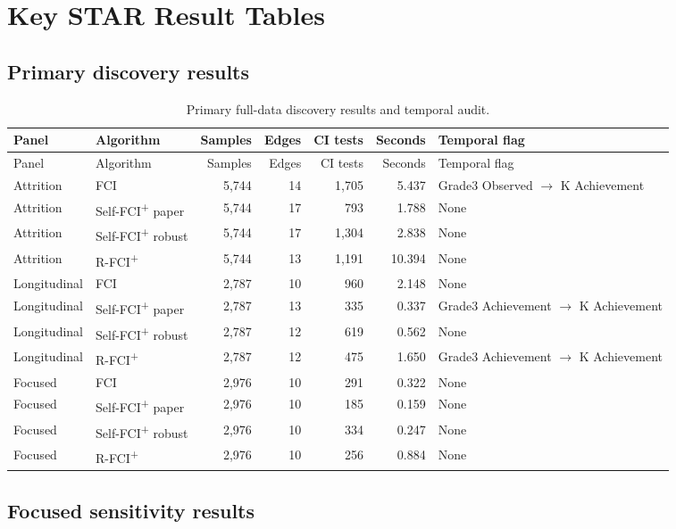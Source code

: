 \documentclass[11pt,a4paper,oneside]{report}
\newcommand{\FCIplus}{FCI\textsuperscript{+}}
\begin{document}
\chapter{Key STAR Result Tables}

\section{Primary discovery results}

\small
\begin{longtable}{@{}p{}p{}rrrrp{}@{}}
\caption{Primary full-data discovery results and temporal audit.}
\label{tab:all-runs}\\
\toprule
Panel & Algorithm & Samples & Edges & CI tests & Seconds & Temporal flag \\
\midrule
\endfirsthead
\toprule
Panel & Algorithm & Samples & Edges & CI tests & Seconds & Temporal flag \\
\midrule
\endhead
Attrition & FCI & 5,744 & 14 & 1,705 & 5.437 &
Grade3 Observed \(\to\) K Achievement \\
Attrition & Self-\FCIplus{} paper & 5,744 & 17 & 793 & 1.788 & None \\
Attrition & Self-\FCIplus{} robust & 5,744 & 17 & 1,304 & 2.838 & None \\
Attrition & R-\FCIplus{} & 5,744 & 13 & 1,191 & 10.394 & None \\
Longitudinal & FCI & 2,787 & 10 & 960 & 2.148 & None \\
Longitudinal & Self-\FCIplus{} paper & 2,787 & 13 & 335 & 0.337 &
Grade3 Achievement \(\to\) K Achievement \\
Longitudinal & Self-\FCIplus{} robust & 2,787 & 12 & 619 & 0.562 & None \\
Longitudinal & R-\FCIplus{} & 2,787 & 12 & 475 & 1.650 &
Grade3 Achievement \(\to\) K Achievement \\
Focused & FCI & 2,976 & 10 & 291 & 0.322 & None \\
Focused & Self-\FCIplus{} paper & 2,976 & 10 & 185 & 0.159 & None \\
Focused & Self-\FCIplus{} robust & 2,976 & 10 & 334 & 0.247 & None \\
Focused & R-\FCIplus{} & 2,976 & 10 & 256 & 0.884 & None \\
\bottomrule
\end{longtable}
\normalsize

\section{Focused sensitivity results}
\end{document}
